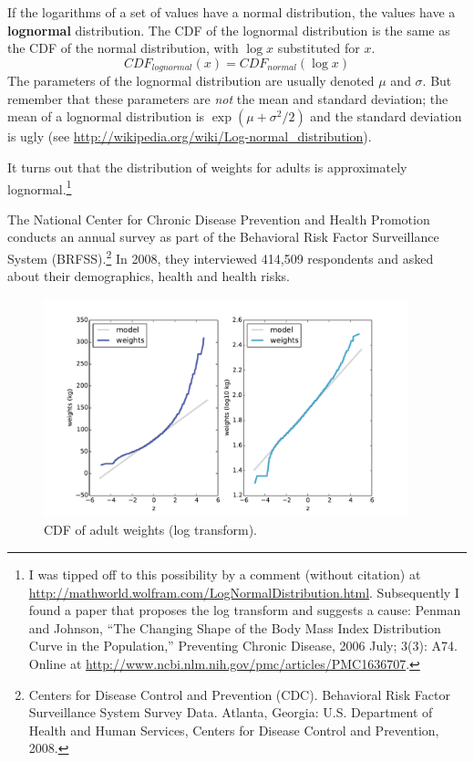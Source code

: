 \documentclass[12pt]{book}
\begin{document}
If the logarithms of a set of values have a normal distribution, the
values have a {\bf lognormal} distribution.  The CDF of the lognormal
distribution is the same as the CDF of the normal distribution,
with $\log x$ substituted for $x$.
%
\[ CDF_{lognormal}(x) = CDF_{normal}(\log x)\]
%
The parameters of the lognormal distribution are usually denoted
$\mu$ and $\sigma$.  But remember that these parameters are {\em not}
the mean and standard deviation; the mean of a lognormal distribution
is $\exp(\mu +\sigma^2/2)$ and the standard deviation is
ugly (see \url{http://wikipedia.org/wiki/Log-normal_distribution}).
  

It turns out that the distribution of weights for adults is
approximately lognormal.\footnote{I was tipped off to this possibility by a
  comment (without citation) at
  \url{http://mathworld.wolfram.com/LogNormalDistribution.html}.
  Subsequently I found a paper that proposes the log transform and
  suggests a cause: Penman and Johnson, ``The Changing Shape of the
  Body Mass Index Distribution Curve in the Population,'' Preventing
  Chronic Disease, 2006 July; 3(3): A74.  Online
  at \url{http://www.ncbi.nlm.nih.gov/pmc/articles/PMC1636707}.}

The National Center for Chronic Disease
Prevention and Health Promotion conducts an annual survey as part of
the Behavioral Risk Factor Surveillance System
(BRFSS).\footnote{Centers for Disease Control and Prevention
  (CDC). Behavioral Risk Factor Surveillance System Survey
  Data. Atlanta, Georgia: U.S. Department of Health and Human
  Services, Centers for Disease Control and Prevention, 2008.}  In
2008, they interviewed 414,509 respondents and asked about their
demographics, health and health risks.


\begin{figure}
\centerline{
\includegraphics[height=2.5in]{figs/brfss_weight_log.pdf}
}
\caption{CDF of adult weights (log
  transform).}
\label{brfss_weight_log}
\end{figure}
\end{document}

